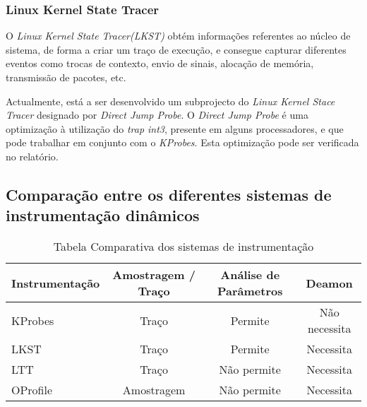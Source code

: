 
\subsubsection{Linux Kernel State Tracer}

O \textit{Linux Kernel State Tracer(LKST)} obtém informações referentes ao núcleo de sistema, de forma a criar um traço de execução, e consegue capturar diferentes eventos como trocas de contexto, envio de sinais, alocação de memória, transmissão de pacotes, etc.

\label{cap:djprobe}
Actualmente, está a ser desenvolvido um subprojecto do \textit{Linux Kernel Stace Tracer} designado por \textit{Direct Jump Probe}.
O \textit{Direct Jump Probe} é uma optimização à utilização do \textit{trap int3}, presente em alguns processadores, e que pode trabalhar em conjunto com o \textit{KProbes}.
Esta optimização pode ser verificada no relatório\cite{Hiramatsu2005}.


\subsection{Comparação entre os diferentes sistemas de instrumentação dinâmicos}
\begin{table}[h!]
\begin{center}
\caption{Tabela Comparativa dos sistemas de instrumentação}
\label{tab:inst_compare}
\begin{tabular}{|l||c|c|c|}
\hline
Instrumentação & Amostragem / Traço & Análise de Parâmetros & Deamon \\
\hline
KProbes & Traço & Permite & Não necessita \\
\hline
LKST & Traço & Permite & Necessita \\
\hline
LTT & Traço & Não permite & Necessita \\
\hline
OProfile & Amostragem & Não permite & Necessita \\
\hline

\end{tabular}
\end{center}
\end{table}

